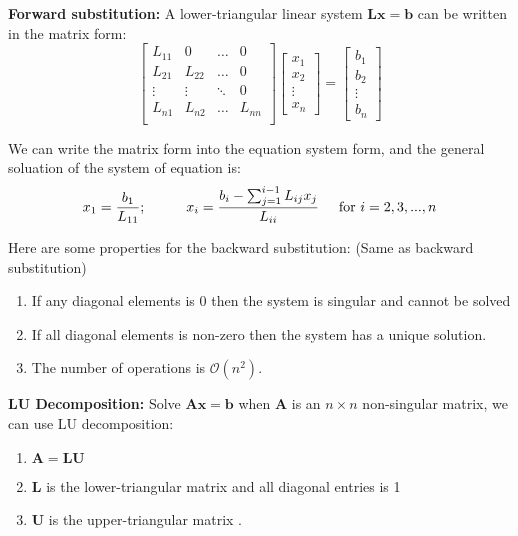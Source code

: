\documentclass[12pt]{article}
\begin{document}
\medskip
\noindent \textbf{Forward substitution:} A lower-triangular linear system $\mathbf{Lx} = \mathbf{b}$ can be written in the matrix form:
    $$\begin{bmatrix} L_{11} & 0 & \ldots & 0 \\ L_{21} & L_{22} & \ldots & 0 \\ \vdots & \vdots & \ddots & 0 \\ L_{n1} & L_{n2} & \ldots & L_{nn} \\ \end{bmatrix} \begin{bmatrix} x_1 \\ x_2 \\ \vdots \\ x_n \end{bmatrix} = \begin{bmatrix} b_1 \\ b_2 \\ \vdots \\ b_n \end{bmatrix}$$

We can write the matrix form into the equation system form, and the general soluation of the system of equation is:  
$$x_1 = \frac{b_1}{L_{11}}; \hspace{1cm} x_i = \frac{b_i - \sum_{j=1}^{i-1} L_{ij} x_j}{L_{ii}} \hspace{5mm} \text{for } i = 2, 3, ..., n$$

Here are some properties for the backward substitution: (Same as backward substitution)
    \begin{enumerate}
        \item If any diagonal elements is 0 then the system is singular and cannot be solved
        \item If all diagonal elements is non-zero then the system has a unique solution.
        \item The number of operations is $\mathcal{O}(n^2)$.
    \end{enumerate}

\newpage
\noindent \textbf{LU Decomposition:} Solve $\mathbf{Ax} = \mathbf{b}$ when $\mathbf{A}$ is an $n \times n$ non-singular matrix, we can use LU decomposition:
    \begin{enumerate}
        \item $\mathbf{A} = \mathbf{LU}$
        \item $\mathbf{L}$ is the lower-triangular matrix and all diagonal entries is 1
        \item $\mathbf{U}$ is the upper-triangular matrix .
    \end{enumerate}
\end{document}
